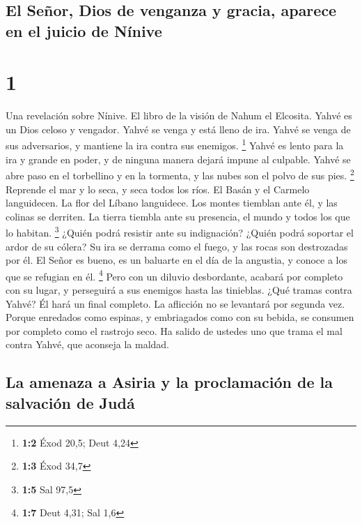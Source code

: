 \hypertarget{el-seuxf1or-dios-de-venganza-y-gracia-aparece-en-el-juicio-de-nuxednive}{%
\subsection{El Señor, Dios de venganza y gracia, aparece en el juicio de
Nínive}\label{el-seuxf1or-dios-de-venganza-y-gracia-aparece-en-el-juicio-de-nuxednive}}

\hypertarget{section}{%
\section{1}\label{section}}

 Una revelación sobre Nínive. El libro de la visión de
Nahum el Elcosita.  Yahvé es un Dios celoso y vengador.
Yahvé se venga y está lleno de ira. Yahvé se venga de sus adversarios, y
mantiene la ira contra sus enemigos. \footnote{\textbf{1:2} Éxod 20,5;
  Deut 4,24}  Yahvé es lento para la ira y grande en
poder, y de ninguna manera dejará impune al culpable. Yahvé se abre paso
en el torbellino y en la tormenta, y las nubes son el polvo de sus pies.
\footnote{\textbf{1:3} Éxod 34,7}  Reprende el mar y lo
seca, y seca todos los ríos. El Basán y el Carmelo languidecen. La flor
del Líbano languidece.  Los montes tiemblan ante él, y las
colinas se derriten. La tierra tiembla ante su presencia, el mundo y
todos los que lo habitan. \footnote{\textbf{1:5} Sal 97,5}
 ¿Quién podrá resistir ante su indignación? ¿Quién podrá
soportar el ardor de su cólera? Su ira se derrama como el fuego, y las
rocas son destrozadas por él.  El Señor es bueno, es un
baluarte en el día de la angustia, y conoce a los que se refugian en él.
\footnote{\textbf{1:7} Deut 4,31; Sal 1,6}  Pero con un
diluvio desbordante, acabará por completo con su lugar, y perseguirá a
sus enemigos hasta las tinieblas.  ¿Qué tramas contra
Yahvé? Él hará un final completo. La aflicción no se levantará por
segunda vez.  Porque enredados como espinas, y
embriagados como con su bebida, se consumen por completo como el
rastrojo seco.  Ha salido de ustedes uno que trama el mal
contra Yahvé, que aconseja la maldad.

\hypertarget{la-amenaza-a-asiria-y-la-proclamaciuxf3n-de-la-salvaciuxf3n-de-juduxe1}{%
\subsection{La amenaza a Asiria y la proclamación de la salvación de
Judá}\label{la-amenaza-a-asiria-y-la-proclamaciuxf3n-de-la-salvaciuxf3n-de-juduxe1}}

